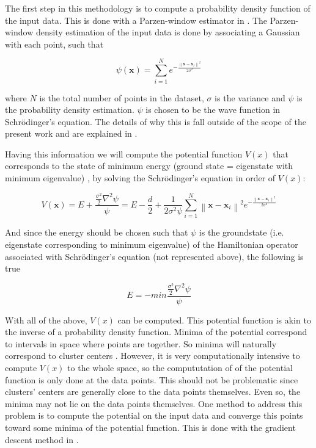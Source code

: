 The first step in this methodology is to compute a probability density function of the input data.
This is done with a Parzen-window estimator in \cite{Horn2001a,Weinstein2009}.
The Parzen-window density estimation of the input data is done by associating a Gaussian with each point, such that

$$ \psi (\mathbf{x}) = \sum ^N _{i=1} e^{- \frac{\left \| \mathbf{x}-\mathbf{x}_i \right \| ^2}{2 \sigma ^2}} $$

where $N$ is the total number of points in the dataset, $\sigma$ is the variance and $\psi$ is the probability density estimation. $\psi$ is chosen to be the wave function in Schrödinger's equation.
The details of why this is fall outside of the scope of the present work and are explained in \cite{Weinstein2009,Horn2001a,Horn2001b}.

Having this information we will compute the potential function $V(x)$ that corresponds to the state of minimum energy (ground state = eigenstate with minimum eigenvalue) \cite{Horn2001a}, by solving the Schrödinger's equation in order of $V(x)$:      

$$
V(\mathbf{x}) = E + \frac {\frac{\sigma^2}{2}\nabla^2 \psi }{\psi} 
= E - \frac{d}{2} + \frac {1}{2 \sigma^2 \psi} \sum ^N _{i=1} \left \| \mathbf{x}-\mathbf{x}_i \right \| ^2 e^{- \frac{\left \| \mathbf{x}-\mathbf{x}_i \right \| ^2}{2 \sigma ^2}}
$$

And since the energy should be chosen such that $\psi$ is the groundstate (i.e. eigenstate corresponding to minimum eigenvalue) of the Hamiltonian operator associated with Schrödinger's equation (not represented above), the following is true

$$
E = - min \frac {\frac{\sigma^2}{2}\nabla^2 \psi }{\psi}
$$

With all of the above, $V(x)$ can be computed.
This potential function is akin to the inverse of a probability density function.
Minima of the potential correspond to intervals in space where points are together.
So minima will naturally correspond to cluster centers \cite{Horn2001a}.
However, it is very computationally intensive to compute $V(x)$ to the whole space, so the compututation of of the potential function is only done at the data points.
This should not be problematic since clusters' centers are generally close to the data points themselves. 
Even so, the minima may not lie on the data points themselves.
One method to address this problem is to compute the potential on the input data and converge this points toward some minima of the potential function.
This is done with the gradient descent method in \cite{Horn2001a}. 

